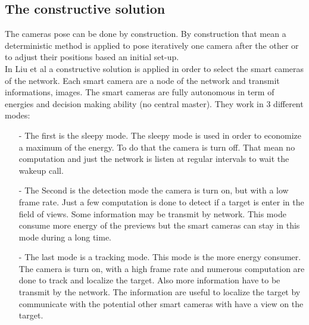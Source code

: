 \subsection{The constructive solution}

The cameras pose can be done by construction. By construction that mean a deterministic method is applied to pose iteratively one camera after the other  or to adjust their positions based an initial set-up.\\
In Liu et al \cite{38*liu2010} a constructive solution is applied in order to select the smart cameras of the network. Each smart camera are a node of the network and transmit informations, images. The smart cameras are fully autonomous in term of energies and decision making ability (no central master). 
They work in 3 different modes:
\begin{itemize}
\item[-] The first is the sleepy mode. The sleepy mode is used in order to economize a maximum of the energy. To do that the camera is turn off. That mean no computation and just the network is listen at regular intervals to wait the wakeup call.   \\

\item[-] The Second is the detection mode the camera is turn on, but with a low frame rate. Just a few computation is done to detect if a target is enter in the field of views. Some information may be transmit by network. This mode consume more energy of the previews but the smart cameras can stay in this mode during a long time.\\

\item[-] The last mode is a tracking mode. This mode is the more energy consumer. The camera is turn on, with a high frame rate and numerous computation are done to track and localize the target. Also more information have to be transmit by the network. The information are useful to localize the target by communicate with the potential other smart cameras with have a view on the target. 
\end{itemize}

